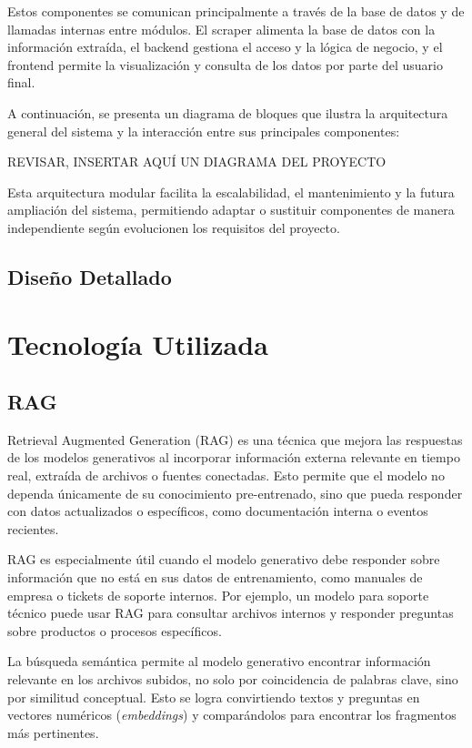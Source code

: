 \documentclass{article}
\begin{document}
Estos componentes se comunican principalmente a través de la base de datos y de llamadas internas entre módulos. El scraper alimenta la base de datos con la información extraída, el backend gestiona el acceso y la lógica de negocio, y el frontend permite la visualización y consulta de los datos por parte del usuario final.

A continuación, se presenta un diagrama de bloques que ilustra la arquitectura general del sistema y la interacción entre sus principales componentes:

REVISAR, INSERTAR AQUÍ UN DIAGRAMA DEL PROYECTO

Esta arquitectura modular facilita la escalabilidad, el mantenimiento y la futura ampliación del sistema, permitiendo adaptar o sustituir componentes de manera independiente según evolucionen los requisitos del proyecto.

\subsection{Diseño Detallado}

\section{Tecnología Utilizada}

\subsection{RAG}
Retrieval Augmented Generation (RAG) es una técnica que mejora las respuestas de los modelos generativos al incorporar información externa relevante en tiempo real, extraída de archivos o fuentes conectadas. Esto permite que el modelo no dependa únicamente de su conocimiento pre-entrenado, sino que pueda responder con datos actualizados o específicos, como documentación interna o eventos recientes.

RAG es especialmente útil cuando el modelo generativo debe responder sobre información que no está en sus datos de entrenamiento, como manuales de empresa o tickets de soporte internos. Por ejemplo, un modelo para soporte técnico puede usar RAG para consultar archivos internos y responder preguntas sobre productos o procesos específicos.

La búsqueda semántica permite al modelo generativo encontrar información relevante en los archivos subidos, no solo por coincidencia de palabras clave, sino por similitud conceptual. Esto se logra convirtiendo textos y preguntas en vectores numéricos (\textit{embeddings}) y comparándolos para encontrar los fragmentos más pertinentes.
\end{document}
